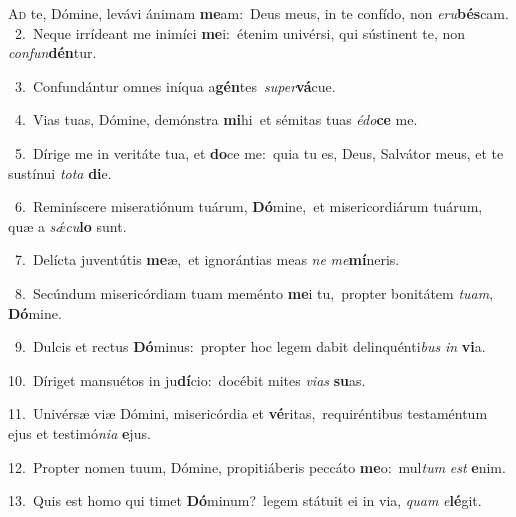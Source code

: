 \lettrine{\initial\textcolor{\initialcolor}{A}}{d} te, Dómine, levávi ánimam \textbf{me}\-am:~\star Deus meus, in te confído, non \textit{e}\-\textit{ru}\textbf{bés}cam.\\
{\numbfont\textcolor{\numbcolor}{~2.}}~Neque irrídeant me inimíci \textbf{me}\-i:~\star étenim univérsi, qui sústinent te, non \textit{con}\-\textit{fun}\textbf{dén}tur.\par
{\numbfont\textcolor{\numbcolor}{~3.}}~Confundántur omnes iníqua a\-\textbf{gén}\-tes~\star \textit{su}\-\textit{per}\textbf{vá}cue.\par
{\numbfont\textcolor{\numbcolor}{~4.}}~Vias tuas, Dómine, demónstra \textbf{mi}\-hi~\star et sémitas tuas \textit{é}\-\textit{do}\textbf{ce} me.\par
{\numbfont\textcolor{\numbcolor}{~5.}}~Dírige me in veritáte tua, et \textbf{do}\-ce me:~\star quia tu es, Deus, Salvátor meus, et te sustínui \textit{to}\-\textit{ta} \textbf{di}\-e.\par
{\numbfont\textcolor{\numbcolor}{~6.}}~Reminíscere miseratiónum tuárum, \textbf{Dó}\-mine,~\star et misericordiárum tuárum, quæ a \textit{sǽ}\-\textit{cu}\textbf{lo} sunt.\par
{\numbfont\textcolor{\numbcolor}{~7.}}~Delícta juventútis \textbf{me}\-æ,~\star et ignorántias meas \textit{ne} \textit{me}\-\textbf{mí}neris.\par
{\numbfont\textcolor{\numbcolor}{~8.}}~Secúndum misericórdiam tuam meménto \textbf{me}\-i tu,~\star propter bonitátem \textit{tu}\-\textit{am}, \textbf{Dó}\-mine.\par
{\numbfont\textcolor{\numbcolor}{~9.}}~Dulcis et rectus \textbf{Dó}\-minus:~\star propter hoc legem dabit delinquénti\textit{bus} \textit{in} \textbf{vi}\-a.\par
{\numbfont\textcolor{\numbcolor}{10.}}~Díriget mansuétos in ju\-\textbf{dí}\-cio:~\star docébit mites \textit{vi}\-\textit{as} \textbf{su}\-as.\par
{\numbfont\textcolor{\numbcolor}{11.}}~Univérsæ viæ Dómini, misericórdia et \textbf{vé}\-ritas,~\star requiréntibus testaméntum ejus et testimó\-\textit{ni}\-\textit{a} \textbf{e}\-jus.\par
{\numbfont\textcolor{\numbcolor}{12.}}~Propter nomen tuum, Dómine, propitiáberis peccáto \textbf{me}\-o:~\star mul\textit{tum} \textit{est} \textbf{e}\-nim.\par
{\numbfont\textcolor{\numbcolor}{13.}}~Quis est homo qui timet \textbf{Dó}\-minum?~\star legem státuit ei in via, \textit{quam} \textit{e}\-\textbf{lé}git.\par
